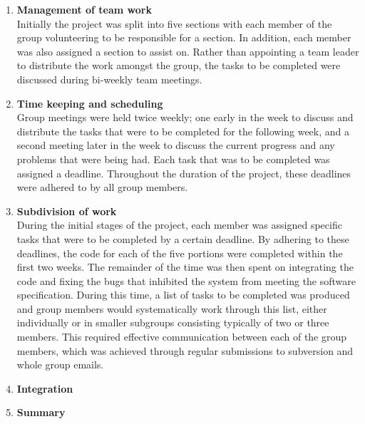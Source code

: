 \begin{enumerate}

	\item \textbf{Management of team work} \\
		Initially the project was split into five sections with each member of the group volunteering 
		to be responsible for a section. In addition, each member was also assigned a section to 
		assist on. Rather than appointing a team leader to distribute the work amongst the group, the 
		tasks to be completed were discussed during bi-weekly team meetings.
		
	\item \textbf{Time keeping and scheduling} \\
		Group meetings were held twice weekly; one early in the week to discuss and distribute the 
		tasks that were to be completed for the following week, and a second meeting later in the week
		to discuss the current progress and any problems that were being had. Each task that was to be
		completed was assigned a deadline. Throughout the duration of the project, these deadlines were
		adhered to by all group members.
	
	\item \textbf{Subdivision of work} \\
		During the initial stages of the project, each member was assigned specific tasks that were to be
		completed by a certain deadline. By adhering to these deadlines, the code for each of the five 
		portions were completed within the first two weeks. The remainder of the time was then spent on
		integrating the code and fixing the bugs that inhibited the system from meeting the software
		specification. During this time, a list of tasks to be completed was produced and group members 
		would systematically work through this list, either individually or in smaller subgroups consisting
		typically of two or three members. This required effective communication between each of the group
		members, which was achieved through regular submissions to subversion and whole group emails.
		
	\item \textbf{Integration} \\
		
		
	\item \textbf{Summary} \\
		 
 
\end{enumerate}
